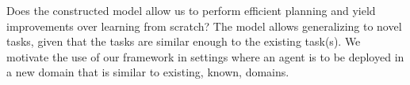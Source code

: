 Does the constructed model allow us to perform efficient planning and yield improvements over learning from scratch? 
The model allows generalizing to novel tasks, given that the tasks are similar enough to the existing task(s).
We motivate the use of our framework in settings where an agent is to be deployed in a new domain that is similar to existing, known, domains.




